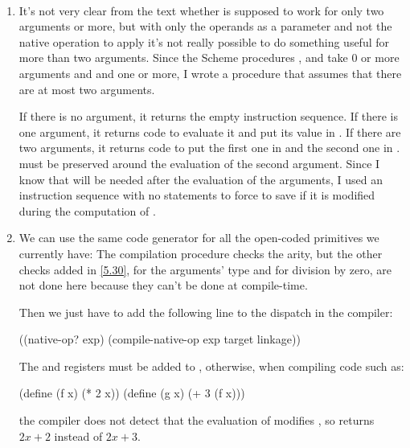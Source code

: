 \begin{exe}[5.38]
    \label{5.38}
    \ \vspace{-20pt}
    \begin{enumerate}
	\item It’s not very clear from the text whether  
	    is supposed to work for only two arguments or more, but with only 
	    the operands as a parameter and not the native operation to apply 
	    it’s not really possible to do something useful for more than two 
	    arguments. Since the Scheme procedures \vscm{=}, \vscm{+} and 
	    \vscm{*} take 0 or more arguments and \vscm{-} and \vscm{/} one or 
	    more, I wrote a procedure that assumes that there are at most two 
	    arguments.

	    If there is no argument, it returns the empty instruction sequence.
	    If there is one argument, it returns code to evaluate it and put its 
	    value in .
	    If there are two arguments, it returns code to put the first one in 
	     and the second one in .  must be 
	    preserved around the evaluation of the second argument. Since I know 
	    that  will be needed after the evaluation of the 
	    arguments, I used an instruction sequence with no statements to 
	    force  to save  if it is modified during 
	    the computation of .

	\item We can use the same code generator for all the open-coded 
	    primitives we currently have:
	    The compilation procedure checks the arity, but the other checks 
	    added in \autoref{5.30}, for the arguments’ type and for division by 
	    zero, are not done here because they can’t be done at compile-time.

	    Then we just have to add the following line to the dispatch in the 
	    compiler:
	    \begin{cscm}
		((native-op? exp) (compile-native-op exp target linkage))
	    \end{cscm}

	    The  and  registers must be added to 
	    , otherwise, when compiling code such as:
	    \begin{cscm}
		(define (f x) (* 2 x))
		(define (g x) (+ 3 (f x)))
	    \end{cscm}
	    the compiler does not detect that the evaluation of  
	    modifies , so  returns $2x + 2$ instead of
	    $2x + 3$.


\end{enumerate}
\end{exe}
